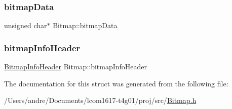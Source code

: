 \subsubsection{\texorpdfstring{bitmap\+Data}{bitmapData}}
{\footnotesize\ttfamily unsigned char$\ast$ Bitmap\+::bitmap\+Data}

\hypertarget{struct_bitmap_a95c481a5ce1ff4af08cd135ca4af120b}{}\label{struct_bitmap_a95c481a5ce1ff4af08cd135ca4af120b} 
\subsubsection{\texorpdfstring{bitmap\+Info\+Header}{bitmapInfoHeader}}
{\footnotesize\ttfamily \hyperlink{struct_bitmap_info_header}{Bitmap\+Info\+Header} Bitmap\+::bitmap\+Info\+Header}



The documentation for this struct was generated from the following file\+:\begin{DoxyCompactItemize}
\item 
/\+Users/andre/\+Documents/lcom1617-\/t4g01/proj/src/\hyperlink{_bitmap_8h}{Bitmap.\+h}\end{DoxyCompactItemize}
